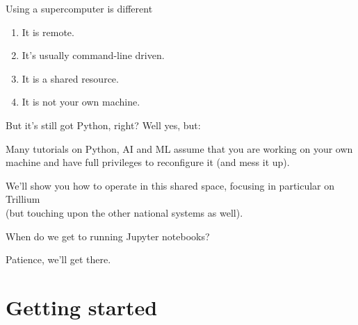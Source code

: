 \documentclass[
  10pt,
  ignorenonframetext,
  aspectratio=169]{beamer}
\begin{document}
\begin{frame}{Using a supercomputer is different}
\label{using-a-supercomputer-is-different}
\pause

\begin{enumerate}
\item
  It is remote.

  \pause
\item
  It's usually command-line driven.

  \pause
\item
  It is a shared resource.

  \pause
\item
  It is not your own machine.
\end{enumerate}
\end{frame}

\begin{frame}{But it's still got Python, right?}
\label{but-its-still-got-python-right}
Well yes, but:

\pause

\begin{block}{}\setlength{\parskip}{0.5\baselineskip}
\label{section}
Many tutorials on Python, AI and ML assume that you are working on your own machine and have full privileges to reconfigure it (and mess it up). \vspace{\baselineskip}

\pause
\end{block}

\begin{block}{}\setlength{\parskip}{0.5\baselineskip}
\label{section-1}
We'll show you how to operate in this shared space, focusing in particular on Trillium\\
(but touching upon the other national systems as well). \vspace{\baselineskip}

\pause
\end{block}

\begin{block}{When do we get to running Jupyter notebooks?}\setlength{\parskip}{0.5\baselineskip}
\label{when-do-we-get-to-running-jupyter-notebooks}
\pause

Patience, we'll get there. \vspace{\baselineskip}
\end{block}
\end{frame}

\section{Getting started}\label{getting-started}
\end{document}
